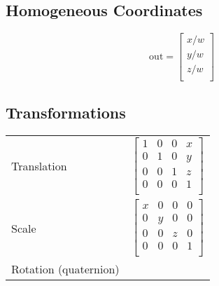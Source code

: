 \documentclass{article}
\begin{document}
\begin{landscape}
\begin{multicols}{3}
            \section{Homogeneous Coordinates}
            $$
            \text{out}
            =
            \begin{bmatrix}
                x/w \\
                y/w \\
                z/w \\
            \end{bmatrix}
            $$
            \subsection{Transformations}
            \begin{small}
                \begin{tabular}{l l}
                    Translation & {
                    $$
                    \begin{bmatrix}
                        1 & 0 & 0 & x \\
                        0 & 1 & 0 & y \\
                        0 & 0 & 1 & z \\
                        0 & 0 & 0 & 1 \\
                    \end{bmatrix}
                    $$
                    } \\
                    Scale & {
                    $$
                    \begin{bmatrix}
                        x & 0 & 0 & 0 \\
                        0 & y & 0 & 0 \\
                        0 & 0 & z & 0 \\
                        0 & 0 & 0 & 1 \\
                    \end{bmatrix}
                    $$
                    } \\
                    Rotation (quaternion)
                \end{tabular}
            \end{small}
        \end{multicols}
    \end{landscape}
\end{document}
